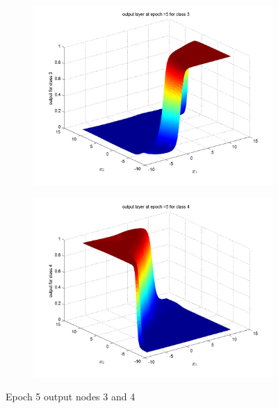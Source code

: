 \documentclass{article}
\begin{document}
\begin{figure}
\begin{subfigure}{.5\textwidth}
  \centering
  \includegraphics[width=.8\linewidth]{Classification/overlapping/5_3}
 
\end{subfigure}%
\begin{subfigure}{.5\textwidth}
  \centering
  \includegraphics[width=.8\linewidth]{Classification/overlapping/5_4}
  \end{subfigure}
\caption{Epoch 5 output nodes 3 and 4}
\end{figure}
\end{document}
